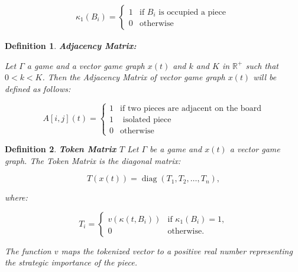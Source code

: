 \documentclass[11pt,a4paper]{article}
\theoremstyle{plain}
\newtheorem{definition}{Definition}[section]
\theoremstyle{definition}
\begin{document}
\vspace{0.5em}

\begin{equation}
\begin{aligned}
\kappa_1(B_i) = 
\begin{cases}
1 & \text{if } B_i \text{ is occupied a piece } \\
0 & \text{otherwise}
\end{cases}
\end{aligned}
\label{eq:Tokenized-Vector}
\end{equation}

\vspace{0.5em}

\begin{definition}\textbf{Adjacency Matrix:}

\vspace{0.5em}

Let $\Gamma$ a game and a vector game graph $x(t)$ and $k$ and $K$ in $\mathbb{R}^{+}$ such that $0<k< K$. Then the Adjacency Matrix of vector game graph $x(t)$ will be defined as follows:

\vspace{0.5em}

\begin{equation}
A[i,j](t) = 
\begin{cases}
1 & \text{if two pieces are adjacent on the board} \\[1em]
1 & \text{ isolated piece }\\[1em]
0 & \text{otherwise }
\end{cases}
\end{equation}

\vspace{0.5em}

\label{def:Adjacency_Matrix}
\end{definition}

\vspace{0.5em}

\begin{definition}\textbf{Token Matrix \(T\)}
\label{def:Token_Matrix}
Let \(\Gamma\) be a game and \(x(t)\) a vector game graph. The Token Matrix is the diagonal matrix:

\vspace{0.5em}

\[
T(x(t)) = \operatorname{diag}(T_1, T_2, \dots, T_n),
\]

\vspace{0.5em}

where:

\vspace{0.5em}

\[
T_i = 
\begin{cases}
v(\kappa(t, B_i)) & \text{if }\kappa_1(B_i)=1, \\
0 & \text{otherwise}.
\end{cases}
\]

\vspace{0.5em}

The function \(v\) maps the tokenized vector to a positive real number representing the strategic importance of the piece.
\end{definition}
\end{document}
